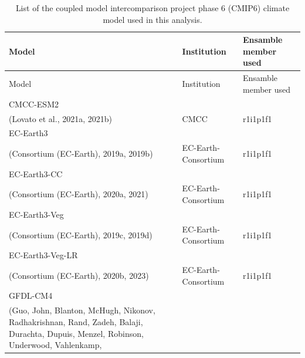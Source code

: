 \documentclass[
]{agujournal2019}
\begin{document}
\begin{longtable}[]{@{}
  >{\raggedright\arraybackslash}p{}
  >{\raggedright\arraybackslash}p{}
  >{\raggedright\arraybackslash}p{}@{}}
\caption{List of the coupled model intercomparison project phase 6
(CMIP6) climate model used in this
analysis.}\label{tbl-models}\tabularnewline
\toprule\noalign{}
\begin{minipage}[b]{\linewidth}\raggedright
Model
\end{minipage} & \begin{minipage}[b]{\linewidth}\raggedright
Institution
\end{minipage} & \begin{minipage}[b]{\linewidth}\raggedright
Ensamble member used
\end{minipage} \\
\midrule\noalign{}
\endfirsthead
\toprule\noalign{}
\begin{minipage}[b]{\linewidth}\raggedright
Model
\end{minipage} & \begin{minipage}[b]{\linewidth}\raggedright
Institution
\end{minipage} & \begin{minipage}[b]{\linewidth}\raggedright
Ensamble member used
\end{minipage} \\
\midrule\noalign{}
\endhead
\bottomrule\noalign{}
\endlastfoot
CMCC-ESM2 & & \\
(Lovato et al., 2021a, 2021b) & CMCC & r1i1p1f1 \\
EC-Earth3 & & \\
(Consortium (EC-Earth), 2019a, 2019b) & EC-Earth-Consortium &
r1i1p1f1 \\
EC-Earth3-CC & & \\
(Consortium (EC-Earth), 2020a, 2021) & EC-Earth-Consortium & r1i1p1f1 \\
EC-Earth3-Veg & & \\
(Consortium (EC-Earth), 2019c, 2019d) & EC-Earth-Consortium &
r1i1p1f1 \\
EC-Earth3-Veg-LR & & \\
(Consortium (EC-Earth), 2020b, 2023) & EC-Earth-Consortium & r1i1p1f1 \\
GFDL-CM4 & & \\
(Guo, John, Blanton, McHugh, Nikonov, Radhakrishnan, Rand, Zadeh,
Balaji, Durachta, Dupuis, Menzel, Robinson, Underwood, Vahlenkamp,

\end{longtable}
\end{document}
